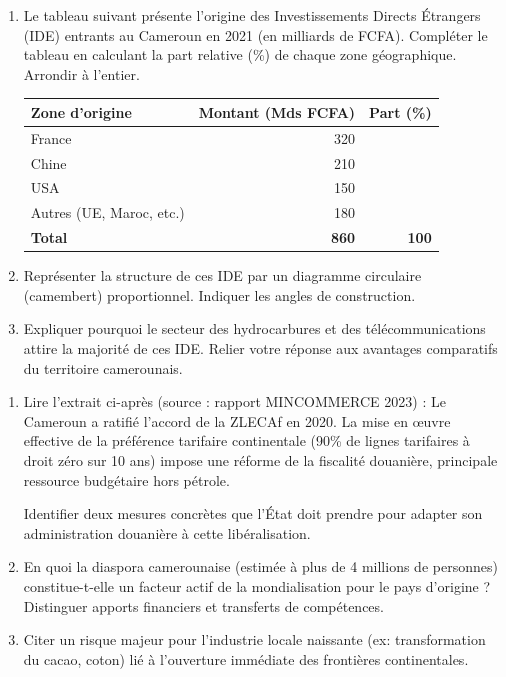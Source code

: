 \documentclass[11pt]{article}
\begin{document}
\begin{exercice}
\begin{enumerate}
    \item Le tableau suivant présente l'origine des Investissements Directs Étrangers (IDE) entrants au Cameroun en 2021 (en milliards de FCFA). Compléter le tableau en calculant la part relative (\%) de chaque zone géographique. Arrondir à l'entier.
    
    \begin{tabular}{lrr}
        \hline
        \textbf{Zone d'origine} & \textbf{Montant (Mds FCFA)} & \textbf{Part (\%)} \\
        \hline
        France & 320 & \\
        Chine & 210 & \\
        USA & 150 & \\
        Autres (UE, Maroc, etc.) & 180 & \\
        \textbf{Total} & \textbf{860} & \textbf{100} \\
        \hline
    \end{tabular}
    
    \item Représenter la structure de ces IDE par un diagramme circulaire (camembert) proportionnel. Indiquer les angles de construction.
    \item Expliquer pourquoi le secteur des hydrocarbures et des télécommunications attire la majorité de ces IDE. Relier votre réponse aux avantages comparatifs du territoire camerounais.
\end{enumerate}
\end{exercice}

\begin{exercice}
\begin{enumerate}
    \item Lire l'extrait ci-après (source : rapport MINCOMMERCE 2023) : 
    \og Le Cameroun a ratifié l'accord de la ZLECAf en 2020. La mise en œuvre effective de la préférence tarifaire continentale (90\% de lignes tarifaires à droit zéro sur 10 ans) impose une réforme de la fiscalité douanière, principale ressource budgétaire hors pétrole. \fg
    
    Identifier deux mesures concrètes que l'État doit prendre pour adapter son administration douanière à cette libéralisation.
    \item En quoi la diaspora camerounaise (estimée à plus de 4 millions de personnes) constitue-t-elle un facteur actif de la mondialisation pour le pays d'origine ? Distinguer apports financiers et transferts de compétences.
    \item Citer un risque majeur pour l'industrie locale naissante (ex: transformation du cacao, coton) lié à l'ouverture immédiate des frontières continentales.
\end{enumerate}
\end{exercice}
\end{document}
